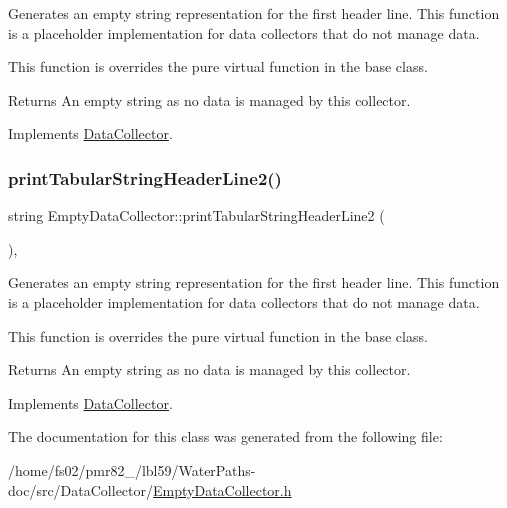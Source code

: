 Generates an empty string representation for the first header line. This function is a placeholder implementation for data collectors that do not manage data. 

This function is overrides the pure virtual function in the base class.

\begin{DoxyReturn}{Returns}
An empty string as no data is managed by this collector. 
\end{DoxyReturn}


Implements \mbox{\hyperlink{classDataCollector_a91619cfa9e9b8cefd2f7c20d5718b41e}{Data\+Collector}}.

\mbox{\label{classEmptyDataCollector_aa71282121251d344d674223409445be9}} 
\subsubsection{\texorpdfstring{print\+Tabular\+String\+Header\+Line2()}{printTabularStringHeaderLine2()}}
{\footnotesize\ttfamily string Empty\+Data\+Collector\+::print\+Tabular\+String\+Header\+Line2 (\begin{DoxyParamCaption}{ }\end{DoxyParamCaption})\hspace{0.3cm}{\ttfamily [override]}, {\ttfamily [virtual]}}



Generates an empty string representation for the first header line. This function is a placeholder implementation for data collectors that do not manage data. 

This function is overrides the pure virtual function in the base class.

\begin{DoxyReturn}{Returns}
An empty string as no data is managed by this collector. 
\end{DoxyReturn}


Implements \mbox{\hyperlink{classDataCollector_af01ea961314be2164f39e6d4cd59e443}{Data\+Collector}}.



The documentation for this class was generated from the following file\+:\begin{DoxyCompactItemize}
\item 
/home/fs02/pmr82\+\_/lbl59/\+Water\+Paths-\/doc/src/\+Data\+Collector/\mbox{\hyperlink{EmptyDataCollector_8h}{Empty\+Data\+Collector.\+h}}\end{DoxyCompactItemize}
